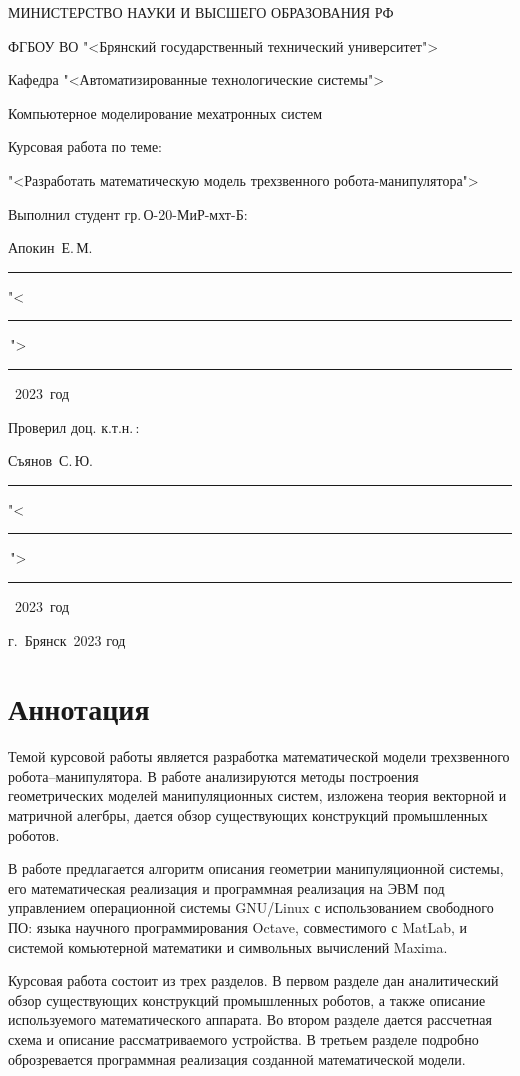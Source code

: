 \documentclass[oneside, final, 14pt]{extarticle}
\begin{document}
\begin{titlepage}
  \centerline{МИНИСТЕРСТВО НАУКИ И ВЫСШЕГО ОБРАЗОВАНИЯ РФ}
  \medskip
  \centerline{ФГБОУ ВО "<Брянский государственный технический университет">}
  \vfill
  \centerline{Кафедра "<Автоматизированные технологические системы">}
  \vfill
  \vfill
  \centerline{Компьютерное моделирование мехатронных систем}
  \vfill
  \centerline{Курсовая работа по теме:}
  \medskip
  \centerline{"<Разработать математическую модель трехзвенного робота-манипулятора">}
  \vfill
  \null \hfill
  \begin{minipage}{0.52\textwidth}
    Выполнил студент гр.\,О-20-МиР-мхт-Б:
	\par
	\medskip
	Апокин~Е.\,М.\,
	\rule{5.5cm}{0.25pt}
	\par
	\medskip
	"<\rule{1.25cm}{0.25pt}\,">\rule{5cm}{0.25pt}~2023~год
	\par
	\bigskip
	Проверил доц. к.т.н.\,:
	\par
	\medskip
	Съянов~С.\,Ю.\,
	\rule{5.5cm}{0.25pt}
	\par
	\medskip
	"<\rule{1.25cm}{0.25pt}\,">\rule{5cm}{0.25pt}~2023~год
  \end{minipage}
  \vfill
  \centerline{г.~Брянск~2023 год}
\end{titlepage}
\setcounter{page}{2}

\section*{Аннотация}

Темой курсовой работы является разработка математической модели трехзвенного робота--манипулятора.
В работе анализируются методы построения геометрических моделей манипуляционных систем, изложена теория векторной и матричной алегбры, дается обзор существующих конструкций промышленных роботов.
\par
В работе предлагается алгоритм описания геометрии манипуляционной системы, его математическая реализация и программная реализация на ЭВМ под управлением операционной системы GNU/Linux с использованием свободного ПО: языка научного программирования Octave, совместимого с MatLab, и системой комьютерной математики и символьных вычислений Maxima.
\par
Курсовая работа состоит из трех разделов.
В первом разделе дан аналитический обзор существующих конструкций промышленных роботов, а также описание используемого математического аппарата.
Во втором разделе дается рассчетная схема и описание рассматриваемого устройства.
В третьем разделе подробно оброзревается программная реализация созданной математической модели.
\end{document}

